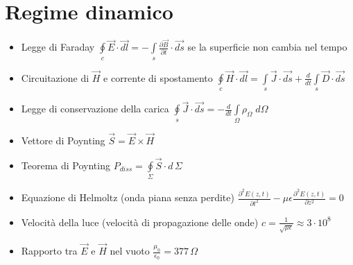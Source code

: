 \documentclass{article}
\begin{document}
\section{Regime dinamico}
\begin{itemize}
	\item Legge di Faraday \(\oint\limits_c \vec{E} \cdot \vec{dl} = - \int\limits_s \frac{\partial \vec{B}}{\partial t} \cdot \vec{ds} \) se la superficie non cambia nel tempo
	\item Circuitazione di \( \vec{H} \) e corrente di spostamento \( \oint\limits_c \vec{H} \cdot \vec{dl} = \int\limits_s \vec{J} \cdot \vec{ds} + \frac{d}{dt} \int\limits_s \vec{D} \cdot \vec{ds} \)
	\item Legge di conservazione della carica \( \oint\limits_s \vec{J} \cdot \vec{ds} = -\frac{d}{dt} \int\limits_\Omega \rho_\Omega \; d\Omega \)
	\item Vettore di Poynting \( \vec{S} = \vec{E} \times \vec{H} \)
	\item Teorema di Poynting \( P_{diss} = \oint\limits_\Sigma \vec{S} \cdot d\,\Sigma \)
	\item Equazione di Helmoltz (onda piana senza perdite) \( \frac{\partial^2 E(z, t)}{\partial t^2} - \mu \epsilon \frac{\partial^2 E(z, t)}{\partial z^2} = 0\)
	\item Velocità della luce (velocità di propagazione delle onde) \( c = \frac{1}{\sqrt{\mu \epsilon}} \approx 3 \cdot 10^8 \)
	\item Rapporto tra \( \vec{E} \) e \( \vec{H} \) nel vuoto \( \frac{\mu_0}{\epsilon_0} = 377 \, \Omega \)
\end{itemize}
\end{document}
